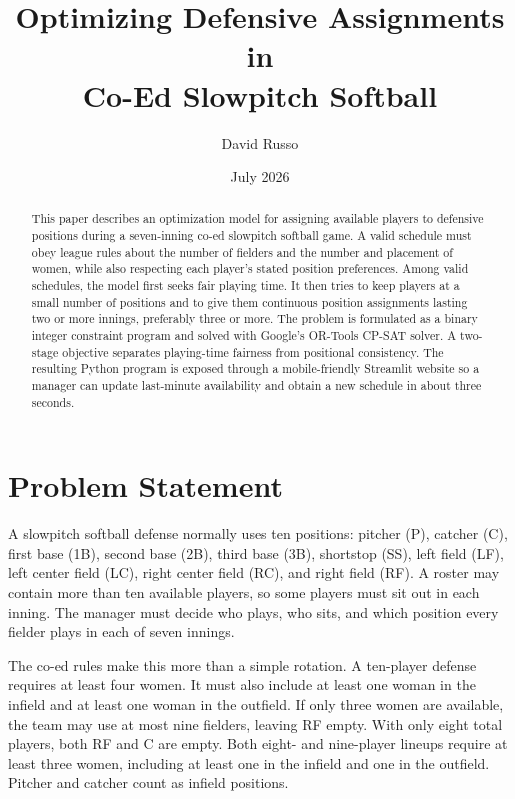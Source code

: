 \documentclass[11pt]{article}
\title{\vspace{-1.3cm}\textbf{Optimizing Defensive Assignments in\\
Co-Ed Slowpitch Softball}}
\author{David Russo}
\date{July 2026}
\begin{document}
\maketitle
\vspace{-0.8cm}

\begin{abstract}
This paper describes an optimization model for assigning available players to
defensive positions during a seven-inning co-ed slowpitch softball game. A
valid schedule must obey league rules about the number of fielders and the
number and placement of women, while also respecting each player's stated
position preferences. Among valid schedules, the model first seeks fair
playing time. It then tries to keep players at a small number of positions and
to give them continuous position assignments lasting two or more innings,
preferably three or more. The problem is formulated as a binary integer
constraint program and solved with Google's OR-Tools CP-SAT solver. A
two-stage objective separates playing-time fairness from positional
consistency. The resulting Python program is exposed through a mobile-friendly
Streamlit website so a manager can update last-minute availability and obtain
a new schedule in about three seconds.
\end{abstract}

\section{Problem Statement}

A slowpitch softball defense normally uses ten positions: pitcher (P),
catcher (C), first base (1B), second base (2B), third base (3B), shortstop
(SS), left field (LF), left center field (LC), right center field (RC), and
right field (RF). A roster may contain more than ten available players, so
some players must sit out in each inning. The manager must decide who plays,
who sits, and which position every fielder plays in each of seven innings.

The co-ed rules make this more than a simple rotation. A ten-player defense
requires at least four women. It must also include at least one woman in the
infield and at least one woman in the outfield. If only three women are
available, the team may use at most nine fielders, leaving RF empty. With only
eight total players, both RF and C are empty. Both eight- and nine-player
lineups require at least three women, including at least one in the infield and
one in the outfield. Pitcher and catcher count as infield positions.
\end{document}
